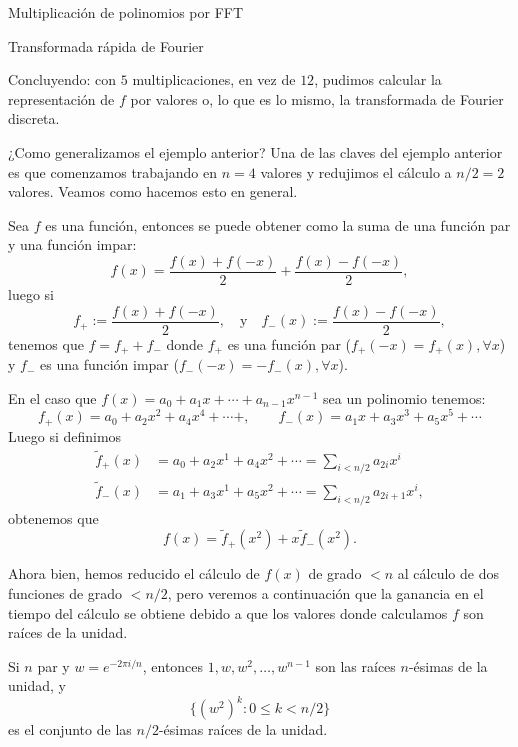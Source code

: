 \begin{chapter}{Multiplicación de polinomios por FFT}
\begin{section}{Transformada rápida de Fourier}
\begin{ejemplo*}
            Concluyendo: con $5$ multiplicaciones,  en vez de $12$, pudimos calcular la representación de $f$ por valores o, lo que es lo mismo, la transformada de Fourier discreta.
        \end{ejemplo*}

        ¿Como generalizamos el ejemplo anterior? Una de las claves del ejemplo anterior es que comenzamos trabajando en $n=4$ valores y redujimos  el cálculo a $n/2=2$ valores. Veamos como hacemos esto en general.   

        Sea  $f$  es una función, entonces se puede obtener como la suma de una función par y una función impar: 
        $$
        f(x) = \frac{f(x) + f(-x)}{2} + \frac{f(x) - f(-x)}{2},  
        $$
        luego si
        $$
        f_+ := \frac{f(x) + f(-x)}{2}, \quad \text{y} \quad f_-(x):= \frac{f(x) - f(-x)}{2},  
        $$  
        tenemos que $f = f_+ + f_-$ donde $f_+$ es una función par ($f_+(-x) = f_+(x), \forall x$) y   $f_-$ es una función impar ($f_-(-x) = -f_-(x), \forall x$).
        
        En  el caso que $f(x)= a_0 + a_1x + \cdots + a_{n-1}x^{n-1}$ sea un polinomio tenemos:
        $$
        f_+(x) = a_0 + a_2 x^2 + a_4 x^4 + \cdots + , \qquad f_-(x) = a_1x + a_3 x^3 + a_5 x^5 + \cdots
        $$
        Luego  si definimos 
        \begin{align*}
            \tilde{f}_+(x) &= a_0 + a_2 x^1 + a_4 x^2 + \cdots = \sum_{i<n/2} a_{2i}x^i \\
            \tilde{f}_-(x) &= a_1 + a_3 x^1 + a_5 x^2 + \cdots= \sum_{i<n/2} a_{2i+1}x^i, 
        \end{align*}
        obtenemos que 
        \begin{equation}\label{eq-par-mas-impar}
            f(x) = \tilde{f}_+(x^2) + x \tilde{f}_-(x^2).
        \end{equation}

        Ahora bien,  hemos reducido el cálculo de $f(x)$ de grado $<n$ al cálculo de dos funciones de grado $< n/2$, pero veremos a continuación que la ganancia en el tiempo del cálculo se obtiene debido a que los valores donde calculamos $f$ son raíces de la unidad.    

        \begin{observacion}\label{obs-raices-unidad-div-2} Si $n$ par y $w = e^{-2\pi i /n}$,  entonces $1, w, w^2,\ldots, w^{n-1}$ son las raíces $n$-ésimas de la unidad,  y
            $$
            \{(w^2)^k: 0 \le k < {n}/{2}\}
            $$
            es el conjunto de las $n/2$-ésimas  raíces de la unidad. 
        \end{observacion}


\end{section}
\end{chapter}
